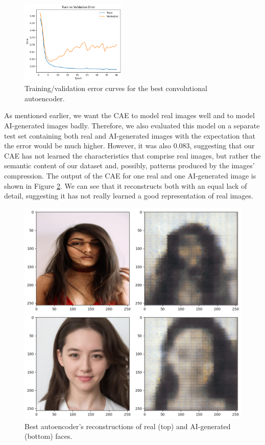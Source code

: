 \documentclass{article} %
\begin{document}
\begin{figure}[h]   
    \begin{center}
        \includegraphics[width=0.45\textwidth]{figs/cae_error_curves.png}
    \end{center}
    \caption{Training/validation error curves for the best convolutional autoencoder.}
    \label{fig:cae_curves}
\end{figure}

As mentioned earlier, we want the CAE to model real images well and to model AI-generated images badly. Therefore, we also evaluated this model on a separate test set containing both real and AI-generated images with the expectation that the error would be much higher. However, it was also $0.083$, suggesting that our CAE has not learned the characteristics that comprise real images, but rather the semantic content of our dataset and, possibly, patterns produced by the images' compression. The output of the CAE for one real and one AI-generated image is shown in Figure \ref{fig:reconstructions}. We can see that it reconstructs both with an equal lack of detail, suggesting it has not really learned a good representation of real images.

\begin{figure}[h]
    \begin{center}
        \includegraphics[scale=0.25]{figs/reconstructions.png}
    \end{center}
    \caption{Best autoencoder's reconstructions of real (top) and AI-generated (bottom) faces.}
    \label{fig:reconstructions}
\end{figure}
\end{document}
